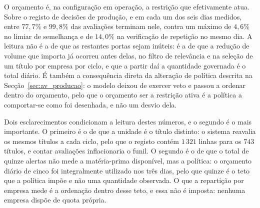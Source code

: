 O orçamento é, na configuração em operação, a restrição que efetivamente atua. Sobre o
registo de decisões de produção, e em cada um dos seis dias medidos, entre $77{,}7\%$ e
$99{,}8\%$ das avaliações terminam nele, contra um máximo de $4{,}6\%$ no limiar de semelhança
e de $14{,}0\%$ na verificação de repetição no mesmo dia. A leitura não
é a de que as restantes portas sejam inúteis: é a de que a redução de volume que importa
já ocorreu antes delas, no filtro de relevância e na seleção de um título por empresa por
ciclo, e que a partir daí a quantidade governada é o total diário. É também a consequência
direta da alteração de política descrita na Secção~\ref{sec:av_producao}: o modelo deixou
de exercer veto e passou a ordenar dentro do orçamento, pelo que o orçamento ser a
restrição ativa é a política a comportar-se como foi desenhada, e não um desvio dela.

Dois esclarecimentos condicionam a leitura destes números, e o segundo é o mais importante. O
primeiro é o de que a unidade é o título distinto: o sistema reavalia os mesmos títulos a cada
ciclo, pelo que o registo contém $1\,321$ linhas para os $743$ títulos, e contar avaliações
inflacionaria o funil. O segundo é o de que o total de quinze alertas não mede a matéria-prima
disponível, mas a política: o orçamento diário de cinco foi integralmente utilizado nos três dias,
pelo que quinze é o teto que a política impõe e não uma quantidade observada. O que a repartição
por empresa mede é a ordenação dentro desse teto, e essa não é imposta: nenhuma empresa dispõe de
quota própria.


